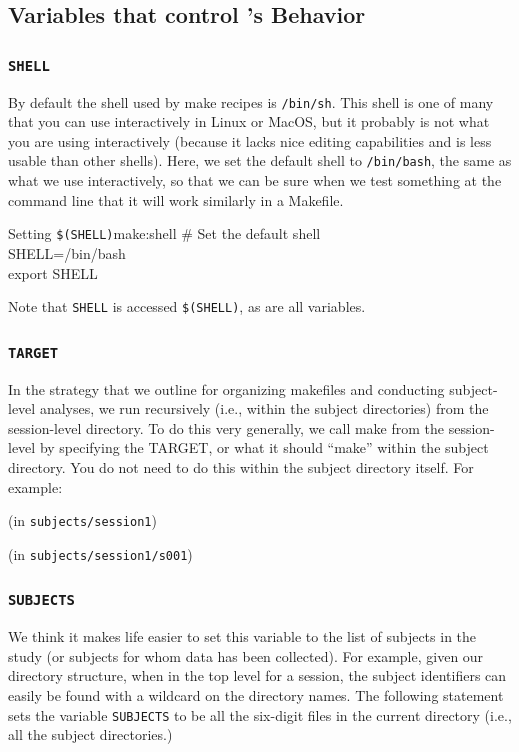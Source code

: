 \subsection{Variables that control \maken{}'s Behavior}

\subsubsection{\texttt{SHELL}}
By default the shell used by make recipes is \texttt{/bin/sh}.  This shell is one of many that you can use interactively in Linux or MacOS, but it probably is not what you are using interactively (because it lacks nice editing capabilities and is less usable than other shells). Here, we set the default shell to \texttt{/bin/bash}, the same as what we use interactively, so that we can be sure when we test something at the command line that it will work similarly in a Makefile.

\begin{make}{Setting \texttt{\$(SHELL)}}{make:shell}
	\# Set the default shell \\
	SHELL=/bin/bash \\
	export SHELL
\end{make}

Note that \texttt{SHELL} is accessed \texttt{\$(SHELL)}, as are all \maken{} variables. 

\subsubsection{\texttt{TARGET}}
In the strategy that we outline for organizing makefiles and conducting subject-level analyses, we run \maken{} recursively (i.e., within the subject directories) from the session-level directory. To do this very generally, we call make from the session-level by specifying the TARGET, or what it should ``make'' within the subject directory. You do not need to do this within the subject directory itself. For example:

(in \texttt{subjects/session1})

(in \texttt{subjects/session1/s001})

\subsubsection{\texttt{SUBJECTS}}
We think it makes life easier to set this variable to the list of subjects in the study (or subjects for whom data has been collected). For example, given our directory structure, when in the top level for a session, the subject identifiers can easily be found with a wildcard on the directory names. The following statement sets the variable \texttt{SUBJECTS} to be all the six-digit files in the current directory (i.e., all the subject directories.) 

